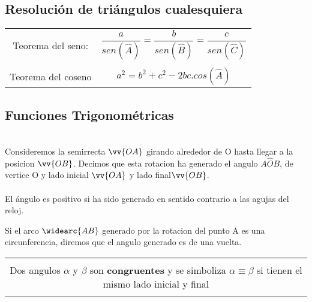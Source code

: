 \documentclass[10pt]{article}
\begin{document}
\subsection{Resolución de triángulos cualesquiera}
\begin{table}[h]
\begin{center}
\begin{tabular}{cc}
Teorema del seno:& $\dfrac{a}{sen(\hat{A})} = \dfrac{b}{sen(\hat{B})} = \dfrac{c}{sen(\hat{C})}$\\ \\
Teorema del coseno & $a^2 = b^2 + c^2 - 2bc.cos(\hat{A})$
\end{tabular}
\end{center}
\end{table}
\subsection{Funciones Trigonométricas}
\begin{multicols}{2}
\\
Consideremos la semirrecta $\vv{OA}$ girando alrededor de O hasta llegar a la posicion $\vv{OB}$. Decimos que esta rotacion ha generado el angulo $A\hat{O}B$, de vertice O y lado inicial $\vv{OA}$ y lado final$\vv{OB}$.\\ \\ El ángulo es positivo si ha sido generado en sentido contrario a las agujas del reloj.
\end{multicols}
Si el arco $\widearc{AB}$ generado por la rotacion del punto A es una circunferencia, diremos que el angulo generado es de una vuelta.\\
\begin{table}[h]
\begin{center}
\begin{tabular}{|c|}
\hline \\
Dos angulos $\alpha$ y $\beta$ son \textbf{congruentes} y se simboliza $\alpha \equiv \beta$ si tienen el mismo lado inicial y final\\ \\
\hline
\end{tabular}
\end{center}
\end{table}
\end{document}
